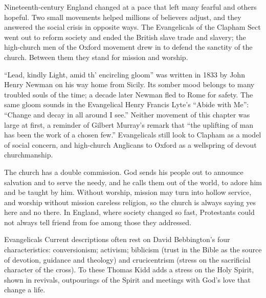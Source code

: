 
\begin{inbrief}
Nineteenth-century England changed at a pace that left many fearful and others hopeful. Two small
movements helped millions of believers adjust, and they answered the social crisis in opposite ways.
The Evangelicals of the Clapham Sect went out to reform society and ended the British slave trade
and slavery; the high-church men of the Oxford movement drew in to defend the sanctity of the
church. Between them they stand for mission and worship.
\end{inbrief}

``Lead, kindly Light, amid th' encircling gloom'' was written in 1833 by John Henry Newman on his
way home from Sicily. Its somber mood belongs to many troubled souls of the time; a decade later
Newman fled to Rome for safety. The same gloom sounds in the Evangelical Henry Francis Lyte's ``Abide
with Me'': ``Change and decay in all around I see.'' Neither movement of this chapter was large at
first, a reminder of Gilbert Murray's remark that ``the uplifting of man has been the work of a
chosen few.'' Evangelicals still look to Clapham as a model of social concern, and high-church
Anglicans to Oxford as a wellspring of devout churchmanship.

The church has a double commission. God sends his people out to announce salvation and to serve the needy, and he calls them out of the world, to adore him and be taught by him. Without worship, mission may turn into hollow service, and worship without mission careless religion, so the church is
always saying yes here and no there. In England, where society changed so fast, Protestants could not always tell friend from foe among those they addressed.

\begin{sidebox}{Evangelicals}
Current descriptions often rest on David Bebbington's four characteristics: conversionism; activism; biblicism (trust in the Bible as the source of devotion, guidance and theology) and
crucicentrism (stress on the sacrificial character of the cross). To these Thomas Kidd adds a stress on the
Holy Spirit, shown in revivals, outpourings of the Spirit and meetings with God's love that change a life.
\end{sidebox}

